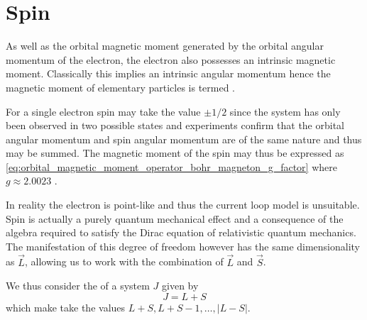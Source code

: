 \section{Spin}
As well as the orbital magnetic moment generated by the orbital angular momentum of the electron, the electron also possesses an intrinsic magnetic moment. Classically this implies an intrinsic angular momentum hence the magnetic moment of elementary particles is termed . 

For a single electron spin may take the value $\pm 1/2$ since the system has only been observed in two possible states \cite{Gerlach1922} and experiments confirm that the orbital angular momentum and spin angular momentum are of the same nature and thus may be summed. 
The magnetic moment of the spin may thus be expressed as \eqref{eq:orbital_magnetic_moment_operator_bohr_magneton_g_factor} \cite{Povh2002-fj} where $g\approx2.0023$ \cite{electron-g-factor, PhysRevLett.130.071801}. 

In reality the electron is point-like and thus the current loop model is unsuitable. Spin is actually a purely quantum mechanical effect and a consequence of the algebra required to satisfy the Dirac equation of relativistic quantum mechanics. The manifestation of this degree of freedom however has the same dimensionality as $\vec{L}$, allowing us to work with the combination of $\vec{L}$ and $\vec{S}$. 

We thus consider the  of a system $J$ given by 
\begin{equation}
    J = L + S 
    \label{eq:total_angular_momentum}
\end{equation}
which make take the values $L+S, L+ S - 1, \dots, |L-S|$. 



